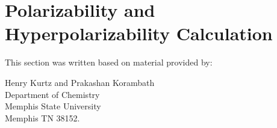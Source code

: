 \section{Polarizability and Hyperpolarizability Calculation}\label{t_polar}
 
%
%
%
%
%
%
This section was written based on material provided by:
\begin{center} Henry Kurtz and Prakashan Korambath\\
Department of Chemistry\\Memphis State University\\
Memphis TN 38152.
\end{center}

